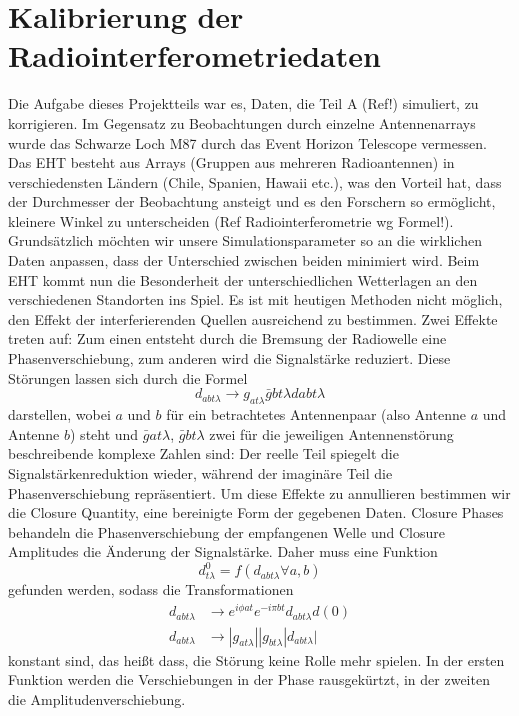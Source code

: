 \documentclass[]{dsadokumentation}
\begin{document}
\section{Kalibrierung der Radiointerferometriedaten}
Die Aufgabe dieses Projektteils war es, Daten, die Teil A (Ref!) simuliert, zu korrigieren. Im Gegensatz zu Beobachtungen durch einzelne Antennenarrays wurde das Schwarze Loch M87 durch das Event Horizon Telescope vermessen. Das EHT besteht aus Arrays (Gruppen aus mehreren Radioantennen) in verschiedensten Ländern (Chile, Spanien, Hawaii etc.), was den Vorteil hat, dass der Durchmesser der Beobachtung  ansteigt und es den Forschern so ermöglicht, kleinere Winkel zu unterscheiden (Ref Radiointerferometrie wg Formel!).
Grundsätzlich möchten wir unsere Simulationsparameter so an die wirklichen Daten anpassen, dass der Unterschied zwischen beiden minimiert wird. Beim EHT kommt nun die Besonderheit der unterschiedlichen Wetterlagen an den verschiedenen Standorten ins Spiel.
Es ist mit heutigen Methoden nicht möglich, den Effekt der interferierenden Quellen ausreichend zu bestimmen. Zwei Effekte treten auf: Zum einen entsteht durch die Bremsung der Radiowelle eine Phasenverschiebung, zum anderen wird die Signalstärke reduziert.
Diese Störungen lassen sich durch die Formel
$$d_{abt\lambda}\rightarrow g_{at\lambda} \bar{g}{bt\lambda}d{abt\lambda} $$
darstellen, wobei $a$ und $b$ für ein betrachtetes Antennenpaar (also Antenne $a$ und Antenne $b$) steht und $\bar{g}{at\lambda}$,  $\bar{g}{bt\lambda}$ zwei für die jeweiligen Antennenstörung beschreibende komplexe Zahlen sind: Der reelle Teil spiegelt die Signalstärkenreduktion wieder, während der imaginäre Teil die Phasenverschiebung repräsentiert.
Um diese Effekte zu annullieren bestimmen wir die Closure Quantity, eine bereinigte Form der gegebenen Daten. Closure Phases behandeln die Phasenverschiebung der empfangenen Welle und Closure Amplitudes die Änderung der Signalstärke. Daher muss eine Funktion
\begin{equation}d^0_{t\lambda}=f(d_{abt\lambda}\forall a,b)\end{equation}
gefunden werden, sodass die Transformationen
\begin{align}
d_{abt\lambda} &\rightarrow e^{i \phi at} e^{-i\pi bt} d_{abt\lambda }d(0)\\
d_{abt\lambda}&\rightarrow|g_{at\lambda}||g_{bt\lambda}|d_{abt\lambda}|
\end{align}
konstant sind, das heißt dass, die Störung keine Rolle mehr spielen. In der ersten Funktion werden die Verschiebungen in der Phase rausgekürtzt, in der zweiten die Amplitudenverschiebung.
\end{document}
